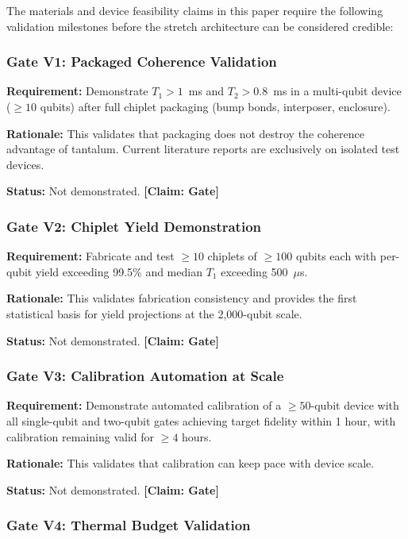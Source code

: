 \documentclass[conference]{IEEEtran}
\begin{document}
The materials and device feasibility claims in this paper require the following validation milestones before the stretch architecture can be considered credible:

\subsubsection{Gate V1: Packaged Coherence Validation}

\textbf{Requirement:} Demonstrate $T_1 > 1$~ms and $T_2 > 0.8$~ms in a multi-qubit device ($\geq 10$ qubits) after full chiplet packaging (bump bonds, interposer, enclosure).

\textbf{Rationale:} This validates that packaging does not destroy the coherence advantage of tantalum. Current literature reports are exclusively on isolated test devices.

\textbf{Status:} Not demonstrated. \textbf{[Claim: Gate]}

\subsubsection{Gate V2: Chiplet Yield Demonstration}

\textbf{Requirement:} Fabricate and test $\geq 10$ chiplets of $\geq 100$ qubits each with per-qubit yield exceeding 99.5\% and median $T_1$ exceeding 500~$\mu$s.

\textbf{Rationale:} This validates fabrication consistency and provides the first statistical basis for yield projections at the 2,000-qubit scale.

\textbf{Status:} Not demonstrated. \textbf{[Claim: Gate]}

\subsubsection{Gate V3: Calibration Automation at Scale}

\textbf{Requirement:} Demonstrate automated calibration of a $\geq 50$-qubit device with all single-qubit and two-qubit gates achieving target fidelity within 1 hour, with calibration remaining valid for $\geq 4$ hours.

\textbf{Rationale:} This validates that calibration can keep pace with device scale.

\textbf{Status:} Not demonstrated. \textbf{[Claim: Gate]}

\subsubsection{Gate V4: Thermal Budget Validation}
\end{document}
